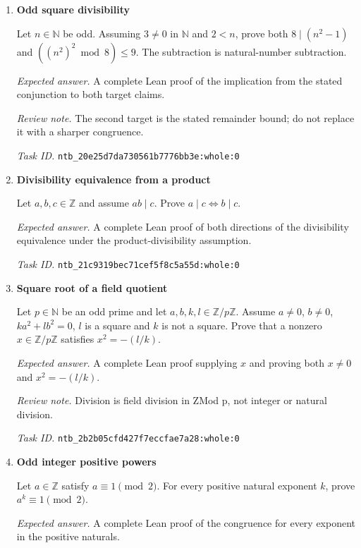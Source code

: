 \documentclass[11pt]{article}
\newcommand{\pth}[1]{\nolinkurl{#1}}
\begin{document}
\begin{enumerate}[label={TEST \arabic*.},leftmargin=4.5em,itemsep=1em]
\emph{Task ID.} \pth{ntb_1d4a55a1396005c641f975de:whole:0}

\item \textbf{Odd square divisibility}\label{qn:test:12}

Let $n\in\mathbb{N}$ be odd. Assuming $3\ne0$ in $\mathbb{N}$ and $2<n$, prove both $8\mid(n^2-1)$ and $((n^2)^2\bmod8)\le9$. The subtraction is natural-number subtraction.

\emph{Expected answer.} A complete Lean proof of the implication from the stated conjunction to both target claims.

\emph{Review note.} The second target is the stated remainder bound; do not replace it with a sharper congruence.

\emph{Task ID.} \pth{ntb_20e25d7da730561b7776bb3e:whole:0}

\item \textbf{Divisibility equivalence from a product}\label{qn:test:13}

Let $a,b,c\in\mathbb{Z}$ and assume $ab\mid c$. Prove $a\mid c\Longleftrightarrow b\mid c$.

\emph{Expected answer.} A complete Lean proof of both directions of the divisibility equivalence under the product-divisibility assumption.

\emph{Task ID.} \pth{ntb_21c9319bec71cef5f8c5a55d:whole:0}

\item \textbf{Square root of a field quotient}\label{qn:test:14}

Let $p\in\mathbb{N}$ be an odd prime and let $a,b,k,l\in\mathbb{Z}/p\mathbb{Z}$. Assume $a\ne0$, $b\ne0$, $ka^2+lb^2=0$, $l$ is a square and $k$ is not a square. Prove that a nonzero $x\in\mathbb{Z}/p\mathbb{Z}$ satisfies $x^2=-(l/k)$.

\emph{Expected answer.} A complete Lean proof supplying $x$ and proving both $x\ne0$ and $x^2=-(l/k)$.

\emph{Review note.} Division is field division in ZMod p, not integer or natural division.

\emph{Task ID.} \pth{ntb_2b2b05cfd427f7eccfae7a28:whole:0}

\item \textbf{Odd integer positive powers}\label{qn:test:15}

Let $a\in\mathbb{Z}$ satisfy $a\equiv1\pmod2$. For every positive natural exponent $k$, prove $a^k\equiv1\pmod2$.

\emph{Expected answer.} A complete Lean proof of the congruence for every exponent in the positive naturals.


\end{enumerate}
\end{document}
